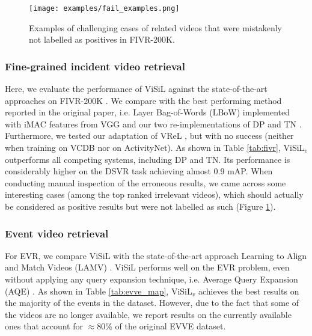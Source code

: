 \documentclass[10pt,twocolumn,letterpaper]{article}
\begin{document}
\begin{figure}[t]
\centering
\texttt{[image: examples/fail\_examples.png]}
\caption{Examples of challenging cases of related videos that were mistakenly not labelled as positives in FIVR-200K.}
\label{fig:fail_examples}
\end{figure}



\subsubsection{Fine-grained incident video retrieval}
\label{sec:fivr}

Here, we evaluate the performance of ViSiL against the state-of-the-art approaches on FIVR-200K \cite{kordopatis2018}. We compare with the best performing method reported in the original paper, i.e. Layer Bag-of-Words (LBoW) \cite{kordopatis2017a} implemented with iMAC features from VGG \cite{simonyan2014} and our two re-implementations of DP \cite{chou2015} and TN \cite{tan2009}. Furthermore, we tested our adaptation of VReL \cite{feng2018}, but with no success (neither when training on VCDB nor on ActivityNet). As shown in Table \ref{tab:fivr}, ViSiL$_v$ outperforms all competing systems, including DP and TN. Its performance is considerably higher on the DSVR task achieving almost 0.9 mAP. When conducting manual inspection of the erroneous results, we came across some interesting cases (among the top ranked irrelevant videos), which should actually be considered as positive results but were not labelled as such  (Figure \ref{fig:fail_examples}).





\subsubsection{Event video retrieval}
\label{sec:evr}

For EVR, we compare ViSiL with the state-of-the-art approach Learning to Align and Match Videos (LAMV) \cite{baraldi2018}. ViSiL performs well on the EVR problem, even without applying any query expansion technique, i.e. Average Query Expansion (AQE) \cite{douze2013}. As shown in Table \ref{tab:evve_map}, ViSiL$_v$ achieves the best results on the majority of the events in the dataset. However, due to the fact that some of the videos are no longer available, we report results on the currently available ones that account for $\approx$80\% of the original EVVE dataset.
\end{document}
